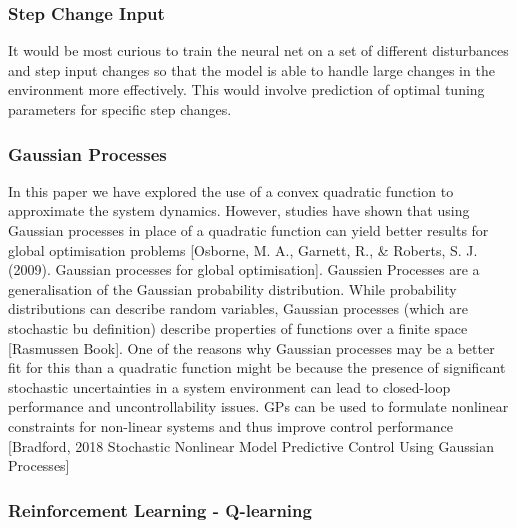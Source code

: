 \documentclass[conference]{IEEEtran}
\theoremstyle{definition}
\begin{document}
\subsubsection{Step Change Input}
It would be most curious to train the neural net on a set of different disturbances and step input changes so that the model is able to handle large changes in the environment more effectively. This would involve prediction of optimal tuning parameters for specific step changes. 
\vspace{2mm}
\subsubsection{Gaussian Processes}
In this paper we have explored the use of a convex quadratic function to approximate the system dynamics. However, studies have shown that using Gaussian processes in place of a quadratic function can yield better results for global optimisation problems [Osborne, M. A., Garnett, R., \& Roberts, S. J. (2009). Gaussian processes for global optimisation]. Gaussien Processes are a generalisation of the Gaussian probability distribution. While probability distributions can describe random variables, Gaussian processes (which are stochastic bu definition) describe properties of functions over a finite space [Rasmussen Book]. One of the reasons why Gaussian processes may be a better fit for this than a quadratic function might be because the presence of significant stochastic uncertainties in a system environment can lead to closed-loop performance and uncontrollability issues. GPs can be used to formulate nonlinear constraints for non-linear systems and thus improve control performance [Bradford, 2018  Stochastic Nonlinear Model Predictive Control Using Gaussian Processes]
\vspace{2mm}
\subsubsection{Reinforcement Learning - Q-learning}
    
\end{document}
